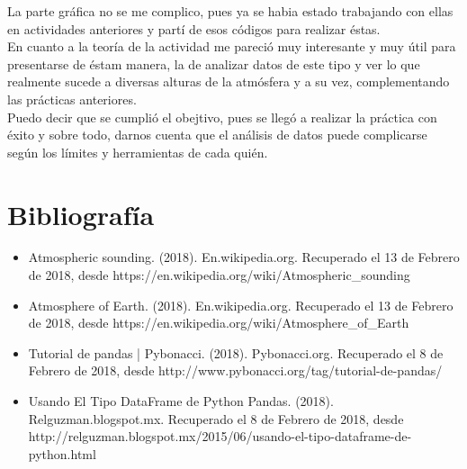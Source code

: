 \documentclass[12pt]{article}
\begin{document}
La parte gráfica no se me complico, pues ya se habia estado trabajando con ellas en actividades anteriores y partí de esos códigos para realizar éstas.\\

En cuanto a la teoría de la actividad me pareció muy interesante y muy útil para presentarse de éstam manera, la de analizar datos de este tipo y ver lo que realmente sucede a diversas alturas de la atmósfera y a su vez, complementando las prácticas anteriores.\\

Puedo decir que se cumplió el obejtivo, pues se llegó a realizar la práctica con éxito y sobre todo, darnos cuenta que el análisis de datos puede complicarse según los límites y herramientas de cada quién.


\section*{Bibliografía}
\begin{itemize}
\item  Atmospheric sounding. (2018). En.wikipedia.org. Recuperado el 13 de Febrero de  2018, desde https://en.wikipedia.org/wiki/Atmospheric\_sounding
\item  Atmosphere of Earth. (2018). En.wikipedia.org. Recuperado el 13 de Febrero de  2018, desde https://en.wikipedia.org/wiki/Atmosphere\_of\_Earth
\item  Tutorial de pandas | Pybonacci. (2018). Pybonacci.org.  Recuperado el 8 de Febrero de  2018, desde http://www.pybonacci.org/tag/tutorial-de-pandas/
\item  Usando El Tipo DataFrame de Python Pandas. (2018). Relguzman.blogspot.mx. Recuperado el 8 de Febrero de  2018, desde http://relguzman.blogspot.mx/2015/06/usando-el-tipo-dataframe-de-python.html
\end{itemize}
\end{document}
